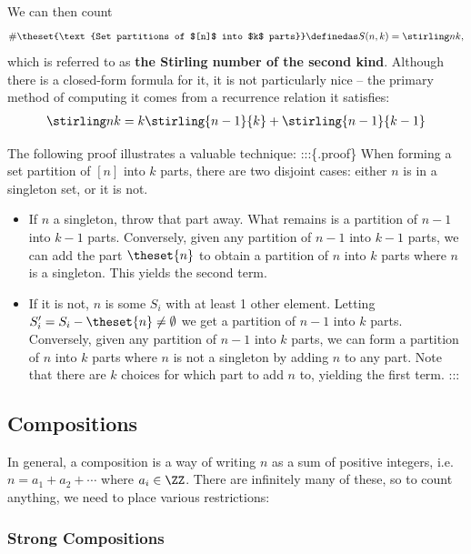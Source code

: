 We can then count
\begin{align*}
\#\theset{\text{Set partitions of $[n]$ into $k$ parts}} \definedas S(n, k) = \stirling n k,
\end{align*} which is referred to as \textbf{the Stirling number of the
second kind}. Although there is a closed-form formula for it, it is not
particularly nice -- the primary method of computing it comes from a
recurrence relation it satisfies:
\begin{align*}
\stirling n k = k\stirling {n-1} {k} + \stirling{n-1}{k-1}
\end{align*}

The following proof illustrates a valuable technique: :::\{.proof\} When
forming a set partition of \([n]\) into \(k\) parts, there are two
disjoint cases: either \(n\) is in a singleton set, or it is not.

\begin{itemize}
\item
  If \(n\) a singleton, throw that part away. What remains is a
  partition of \(n-1\) into \(k-1\) parts. Conversely, given any
  partition of \(n-1\) into \(k-1\) parts, we can add the part
  \(\theset{n}\) to obtain a partition of \(n\) into \(k\) parts where
  \(n\) is a singleton. This yields the second term.
\item
  If it is not, \(n\) is some \(S_i\) with at least 1 other element.
  Letting \(S'_i = S_i - \theset{n} \neq \emptyset\) we get a partition
  of \(n-1\) into \(k\) parts. Conversely, given any partition of
  \(n-1\) into \(k\) parts, we can form a partition of \(n\) into \(k\)
  parts where \(n\) is not a singleton by adding \(n\) to any part. Note
  that there are \(k\) choices for which part to add \(n\) to, yielding
  the first term. :::
\end{itemize}

\hypertarget{compositions}{%
\subsection{Compositions}\label{compositions}}

In general, a composition is a way of writing \(n\) as a sum of positive
integers, i.e.~\(n = a_1 + a_2 + \cdots\) where \(a_i \in \ZZ\). There
are infinitely many of these, so to count anything, we need to place
various restrictions:

\hypertarget{strong-compositions}{%
\subsubsection{Strong Compositions}\label{strong-compositions}}

